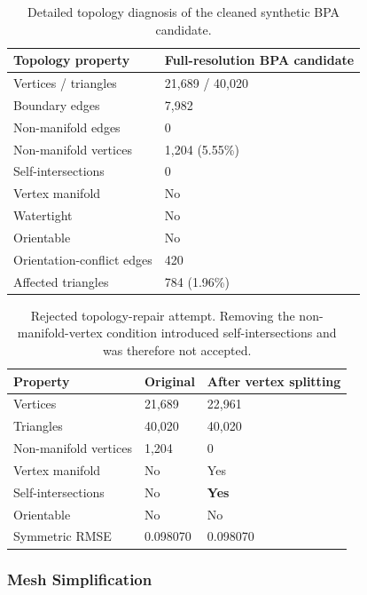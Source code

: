 \begin{table}[!t]
\centering
\footnotesize
\begin{tabularx}{\columnwidth}{@{}lY@{}}
\toprule
\textbf{Topology property} & \textbf{Full-resolution BPA candidate} \\
\midrule
Vertices / triangles & 21,689 / 40,020 \\
Boundary edges & 7,982 \\
Non-manifold edges & 0 \\
Non-manifold vertices & 1,204 (5.55\%) \\
Self-intersections & 0 \\
Vertex manifold & No \\
Watertight & No \\
Orientable & No \\
Orientation-conflict edges & 420 \\
Affected triangles & 784 (1.96\%) \\
\bottomrule
\end{tabularx}
\caption{Detailed topology diagnosis of the cleaned synthetic BPA candidate.}
\label{tab:synthetic-topology}
\end{table}

\begin{table}[!t]
\centering
\footnotesize
\begin{tabularx}{\columnwidth}{@{}lYY@{}}
\toprule
\textbf{Property} & \textbf{Original} & \textbf{After vertex splitting} \\
\midrule
Vertices & 21,689 & 22,961 \\
Triangles & 40,020 & 40,020 \\
Non-manifold vertices & 1,204 & 0 \\
Vertex manifold & No & Yes \\
Self-intersections & No & \textbf{Yes} \\
Orientable & No & No \\
Symmetric RMSE & 0.098070 & 0.098070 \\
\bottomrule
\end{tabularx}
\caption{Rejected topology-repair attempt. Removing the non-manifold-vertex condition introduced self-intersections and was therefore not accepted.}
\label{tab:rejected-topology-repair}
\end{table}

\subsubsection{Mesh Simplification}

